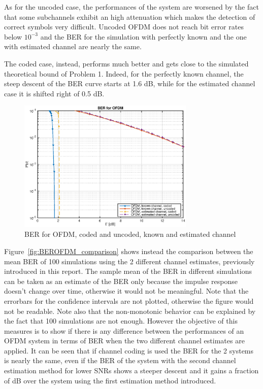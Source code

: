 \documentclass[10pt]{article}
\begin{document}
As for the uncoded case, the performances of the system are worsened by the fact that some subchannels exhibit an high attenuation which makes the detection of correct symbols very difficult. Uncoded OFDM does not reach bit error rates below $10^{-3}$ and the BER for the simulation with perfectly known and the one with estimated channel are nearly the same. 

The coded case, instead, performs much better and gets close to the simulated theoretical bound of Problem 1. Indeed, for the perfectly known channel, the steep descent of the BER curve starts at 1.6 dB, while for the estimated channel case it is shifted right of 0.5 dB.
\begin{figure}[h!]
	\centering
	\includegraphics[width = 0.75\textwidth]{OFDM_BER_1}
	\caption{BER for OFDM, coded and uncoded, known and estimated channel}
	\label{fig:BEROFDM}
\end{figure}

Figure~\ref{fig:BEROFDM_comparison} shows instead the comparison between the mean BER of 100 simulations using the 2 different channel estimates, previously introduced in this report. The sample mean of the BER in different simulations can be taken as an estimate of the BER only because the impulse response doesn't change over time, otherwise it would not be meaningful. Note that the errorbars for the confidence intervals are not plotted, otherwise the figure would not be readable. Note also that the non-monotonic behavior can be explained by the fact that 100 simulations are not enough. However the objective of this measures is to show if there is any difference between the performances of an OFDM system in terms of BER when the two different channel estimates are applied. It can be seen that if channel coding is used the BER for the 2 systems is nearly the same, even if the BER of the system with the second channel estimation method for lower SNRs shows a steeper descent and it gains a fraction of dB over the system using the first estimation method introduced. 
\end{document}
